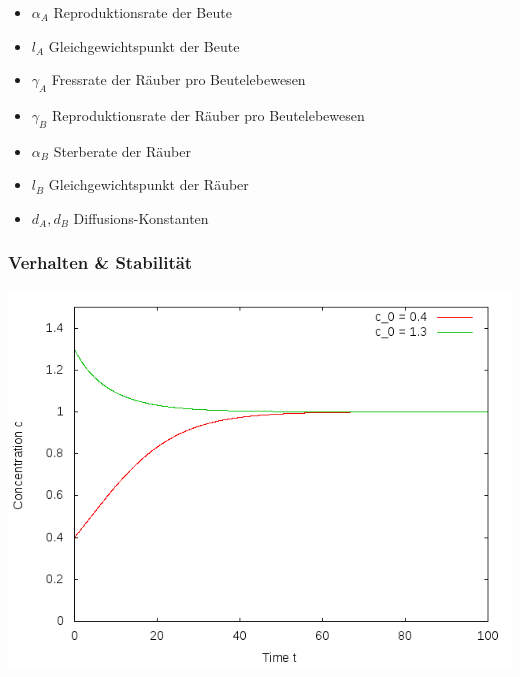 \documentclass[12pt]{beamer}
\begin{document}
\begin{frame}
\begin{tabular}{ r c c c }
	  \\
      \end{tabular}
      \renewcommand{\arraystretch}{1.0}
      \begin{itemize}
	  \item $\alpha_A$ Reproduktionsrate der Beute
	  \item $l_A$ Gleichgewichtspunkt der Beute
	  \item $\gamma_A$ Fressrate der Räuber pro Beutelebewesen
	  \item $\gamma_B$ Reproduktionsrate der Räuber pro Beutelebewesen
	  \item $\alpha_B$ Sterberate der Räuber
	  \item $l_B$ Gleichgewichtspunkt der Räuber
	  \item $d_A, d_B$ Diffusions-Konstanten
      \end{itemize}
    \end{frame}
    
    \begin{frame}
    \frametitle{Verhalten \& Stabilität}
    \includegraphics[scale=0.5]{Bilder/n1_anfangsbedingungen.png}
    \end{frame}
    
\end{document}
